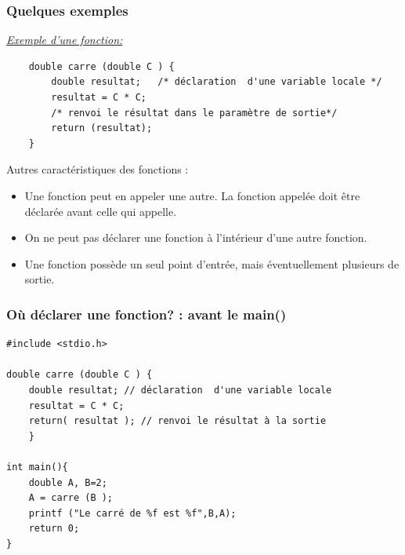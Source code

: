 \documentclass{beamer}
\begin{document}
  
 
\begin{frame}[fragile]
\frametitle{Quelques exemples}
\underline {\em Exemple d'une fonction:}
\begin{verbatim}
    double carre (double C ) {      
        double resultat;   /* déclaration  d'une variable locale */
        resultat = C * C;
        /* renvoi le résultat dans le paramètre de sortie*/
        return (resultat);
    }
\end{verbatim}
    Autres caractéristiques des fonctions :
\begin{itemize}
\item Une fonction peut en appeler une autre. La fonction appelée doit être déclarée avant celle qui appelle.
\item On ne peut pas déclarer une fonction à l'intérieur d'une autre fonction.
\item Une fonction possède un seul point d'entrée, mais éventuellement plusieurs de sortie. 
\end{itemize}

\end{frame}
  
  
 

\begin{frame}[fragile]
\frametitle{Où déclarer  une fonction? : avant le main()}
\begin{verbatim}
#include <stdio.h>

double carre (double C ) {      
    double resultat; // déclaration  d'une variable locale
    resultat = C * C;
    return( resultat ); // renvoi le résultat à la sortie
    }
    
int main(){
 	double A, B=2;
  	A = carre (B );
 	printf ("Le carré de %f est %f",B,A);
    return 0;
}
\end{verbatim}
\end{frame}
\end{document}
